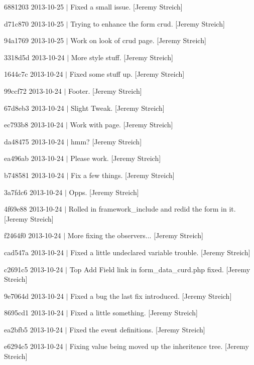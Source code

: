 \begin{DoxyItemize}
\item 6881203 2013-\/10-\/25 $|$ Fixed a small issue. \mbox{[}Jeremy Streich\mbox{]}
\item d71c870 2013-\/10-\/25 $|$ Trying to enhance the form crud. \mbox{[}Jeremy Streich\mbox{]}
\item 94a1769 2013-\/10-\/25 $|$ Work on look of crud page. \mbox{[}Jeremy Streich\mbox{]}
\item 3318d5d 2013-\/10-\/24 $|$ More style stuff. \mbox{[}Jeremy Streich\mbox{]}
\item 1644c7c 2013-\/10-\/24 $|$ Fixed some stuff up. \mbox{[}Jeremy Streich\mbox{]}
\item 99ccf72 2013-\/10-\/24 $|$ Footer. \mbox{[}Jeremy Streich\mbox{]}
\item 67d8eb3 2013-\/10-\/24 $|$ Slight Tweak. \mbox{[}Jeremy Streich\mbox{]}
\item ec793b8 2013-\/10-\/24 $|$ Work with page. \mbox{[}Jeremy Streich\mbox{]}
\item da48475 2013-\/10-\/24 $|$ hmm? \mbox{[}Jeremy Streich\mbox{]}
\item ea496ab 2013-\/10-\/24 $|$ Please work. \mbox{[}Jeremy Streich\mbox{]}
\item b748581 2013-\/10-\/24 $|$ Fix a few things. \mbox{[}Jeremy Streich\mbox{]}
\item 3a7fdc6 2013-\/10-\/24 $|$ Opps. \mbox{[}Jeremy Streich\mbox{]}
\item 4f69e88 2013-\/10-\/24 $|$ Rolled in framework\-\_\-include and redid the form in it. \mbox{[}Jeremy Streich\mbox{]}
\item f2464f0 2013-\/10-\/24 $|$ More fixing the observers... \mbox{[}Jeremy Streich\mbox{]}
\item cad547a 2013-\/10-\/24 $|$ Fixed a little undeclared variable trouble. \mbox{[}Jeremy Streich\mbox{]}
\item c2691c5 2013-\/10-\/24 $|$ Top Add Field link in form\-\_\-data\-\_\-curd.\-php fixed. \mbox{[}Jeremy Streich\mbox{]}
\item 9e7064d 2013-\/10-\/24 $|$ Fixed a bug the last fix introduced. \mbox{[}Jeremy Streich\mbox{]}
\item 8695cd1 2013-\/10-\/24 $|$ Fixed a little something. \mbox{[}Jeremy Streich\mbox{]}
\item ea2bfb5 2013-\/10-\/24 $|$ Fixed the event definitions. \mbox{[}Jeremy Streich\mbox{]}
\item e6294c5 2013-\/10-\/24 $|$ Fixing value being moved up the inheritence tree. \mbox{[}Jeremy Streich\mbox{]}

\end{DoxyItemize}
